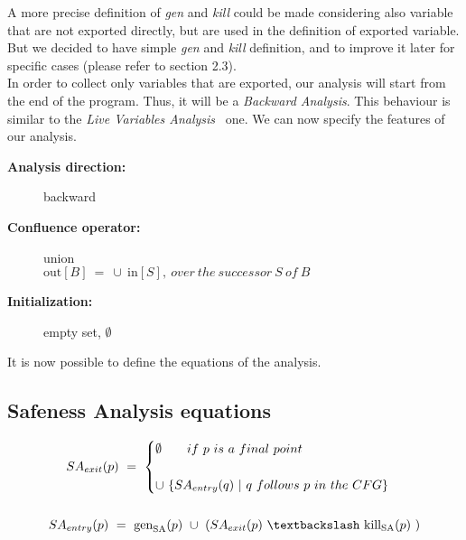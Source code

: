 \documentclass[letterpaper,twocolumn,10pt]{article}
\begin{document}
A more precise definition of \emph{gen} and \emph{kill} could be made considering also variable that are not exported directly, but are used in the definition of exported variable. But we decided to have simple \emph{gen} and \emph{kill} definition, and to improve it later for specific cases (please refer to section 2.3).\\

\indent
In order to collect only variables that are exported, our analysis will start from the end of the program. Thus, it will be a \emph{Backward Analysis}. This behaviour is similar to the \emph{Live Variables Analysis}~\cite{Nielson:1999:PPA:555142} one. We can now specify the features of our analysis. 
\begin{description}
\item[\textbf{Analysis direction:}] backward
\item[\textbf{Confluence operator: }] union\\ $ \text{out}[B]\ =\ \cup\ \text{in}[S],\ over\ the\ successor\ S\ of\ B\  $
\item[\textbf{Initialization: }] empty set, \quad $ \emptyset $
\end{description}

It is now possible to define the equations of the analysis.
\subsection{Safeness Analysis equations}
\begin{gather*}
SA_\textrm{$exit$}(p)\ =\ 
\begin{cases}
\emptyset\qquad if\ p\ is\ a\ final\ point\ \\ \\
\cup\ \lbrace SA_\textrm{$entry$}(q)\ |\ q\ follows\ p\ in\ the\ CFG \rbrace 
\end{cases} \\ \\
SA_\textrm{$entry$}(p)\ =\ \text{gen}_\textrm{SA}(p)\ \cup\ (SA_\textrm{$exit$}(p)\ \textbackslash\ \text{kill}_\textrm{SA}(p)\ )
\end{gather*}
\end{document}
